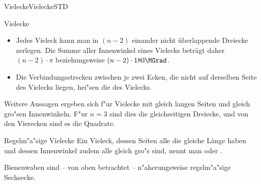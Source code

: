\begin{MXContent}{Vielecke}{Vielecke}{STD}
\begin{MXInfo}{Vielecke}
\begin{itemize}
\item Jedes Vieleck kann man in $(n-2)$ einander nicht \"uberlappende 
 Dreiecke zerlegen. Die Summe aller Innenwinkel eines Vielecks betr\"agt daher 
 $(n-2) \cdot \pi$ beziehungsweise $(n-2) \cdot 180\MGrad$.

\item Die Verbindungsstrecken zwischen je zwei Ecken, die nicht auf derselben 
 Seite des Vielecks liegen, hei"sen die  
 des Vielecks.
\end{itemize}
\end{MXInfo}

Weitere Aussagen ergeben sich f"ur Vielecke mit gleich langen Seiten und 
gleich gro"sen Innenwinkeln. F"ur $n = 3$ sind dies die gleichseitigen 
Dreiecke, und von den Vierecken sind es die Quadrate.

\begin{MXInfo}{Regelm"a"sige Vielecke}
Ein Vieleck, dessen Seiten alle die gleiche L\"ange haben und dessen 
Innenwinkel zudem alle gleich gro"s sind, nennt man
oder .
\end{MXInfo}
Bienenwaben sind -- von oben betrachtet -- n"aherungsweise regelm"a"sige 
Sechsecke.


\end{MXContent}
